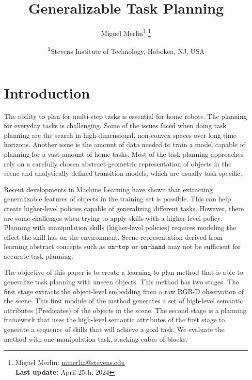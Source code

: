 \documentclass[
	a4paper, %
	10pt, %
	unnumberedsections, %
	twoside, %
]{LTJournalArticle}
\title{Generalizable Task Planning} %
\author{%
	Miguel Merlin\textsuperscript{1} \thanks{Miguel Merlin: \href{mailto:mmerlin@stevens.edu}{mmerlin@stevens.edu}\\ \textbf{Last update:} April 25th, 2024}
}
\date{\footnotesize\textsuperscript{\textbf{1}}Stevens Institute of Technology, Hoboken, NJ, USA}
\begin{document}
\maketitle %


\section{Introduction}

The ability to plan for multi-step tasks is essential for home robots. The planning for everyday tasks is challenging. 
Some of the issues faced when doing task planning are the search in high-dimensional, non-convex spaces over long time 
horizons. Another issue is the amount of data needed to train a model capable of planning for a vast amount of home tasks. 
Most of the task-planning approaches rely on a carefully chosen abstract geometric representation of objects in the scene 
and analytically defined transition models, which are usually task-specific.

\par
Recent developments in Machine Learning have shown that extracting generalizable features of objects in the training 
set is possible. This can help create higher-level policies capable of generalizing different tasks. However, there 
are some challenges when trying to apply skills with a higher-level policy. Planning with manipulation skills (higher-level policies) 
requires modeling the effect the skill has on the environment. Scene representation derived from learning abstract concepts such as 
\(\verb|on-top|\) or \(\verb|on-hand|\) may not be sufficient for accurate task planning. 

\par
The objective of this paper is to create a learning-to-plan method that is able to generalize task planning with unseen objects. 
This method has two stages. The first stage extracts the object-level embedding from a raw RGB-D observation of the scene. 
This first module of the method generates a set of high-level semantic attributes (Predicates) of the objects in the scene. The 
second stage is a planning framework that uses the high-level semantic attributes of the first stage to generate a sequence of skills 
that will achieve a goal task. We evaluate the method with one manipulation task, stacking cubes of blocks. 
\end{document}
